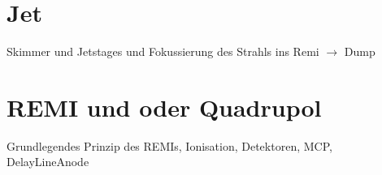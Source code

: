 \section{Jet}





Skimmer und Jetstages und Fokussierung des Strahls ins Remi $\mathrm{\rightarrow}$ Dump


\section{REMI und oder Quadrupol}

Grundlegendes Prinzip des REMIs, Ionisation, Detektoren, MCP, DelayLineAnode


